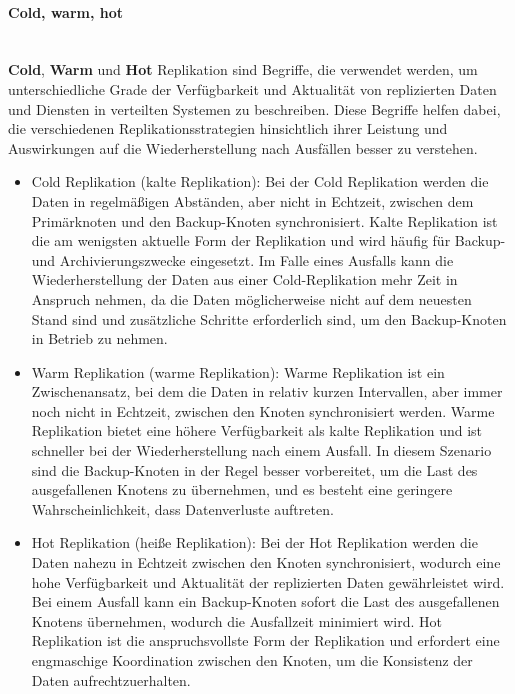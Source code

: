 \documentclass[../vs-script-first-v01.tex]{subfiles}
\begin{document}
\paragraph{Cold, warm, hot}\mbox{}\\
\textbf{Cold}, \textbf{Warm} und \textbf{Hot} Replikation sind Begriffe, die verwendet werden, um unterschiedliche Grade der Verfügbarkeit und Aktualität von replizierten Daten und Diensten in verteilten Systemen zu beschreiben. Diese Begriffe helfen dabei, die verschiedenen Replikationsstrategien hinsichtlich ihrer Leistung und Auswirkungen auf die Wiederherstellung nach Ausfällen besser zu verstehen.
\begin{itemize}
\item Cold Replikation (kalte Replikation): Bei der Cold Replikation werden die Daten in regelmäßigen Abständen, aber nicht in Echtzeit, zwischen dem Primärknoten und den Backup-Knoten synchronisiert. Kalte Replikation ist die am wenigsten aktuelle Form der Replikation und wird häufig für Backup- und Archivierungszwecke eingesetzt. Im Falle eines Ausfalls kann die Wiederherstellung der Daten aus einer Cold-Replikation mehr Zeit in Anspruch nehmen, da die Daten möglicherweise nicht auf dem neuesten Stand sind und zusätzliche Schritte erforderlich sind, um den Backup-Knoten in Betrieb zu nehmen.
\item Warm Replikation (warme Replikation): Warme Replikation ist ein Zwischenansatz, bei dem die Daten in relativ kurzen Intervallen, aber immer noch nicht in Echtzeit, zwischen den Knoten synchronisiert werden. Warme Replikation bietet eine höhere Verfügbarkeit als kalte Replikation und ist schneller bei der Wiederherstellung nach einem Ausfall. In diesem Szenario sind die Backup-Knoten in der Regel besser vorbereitet, um die Last des ausgefallenen Knotens zu übernehmen, und es besteht eine geringere Wahrscheinlichkeit, dass Datenverluste auftreten.
\item Hot Replikation (heiße Replikation): Bei der Hot Replikation werden die Daten nahezu in Echtzeit zwischen den Knoten synchronisiert, wodurch eine hohe Verfügbarkeit und Aktualität der replizierten Daten gewährleistet wird. Bei einem Ausfall kann ein Backup-Knoten sofort die Last des ausgefallenen Knotens übernehmen, wodurch die Ausfallzeit minimiert wird. Hot Replikation ist die anspruchsvollste Form der Replikation und erfordert eine engmaschige Koordination zwischen den Knoten, um die Konsistenz der Daten aufrechtzuerhalten.
\end{itemize}
\end{document}
